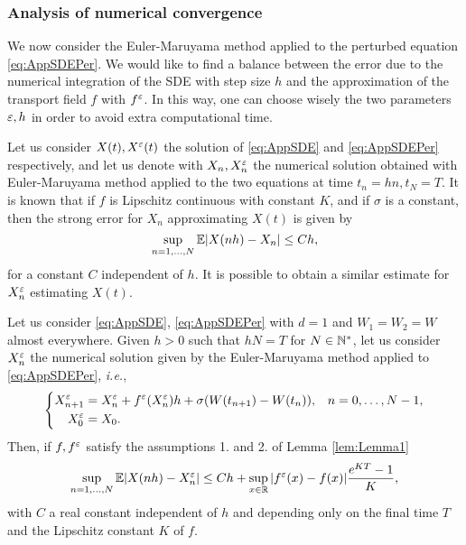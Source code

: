 \subsubsection{Analysis of numerical convergence}

We now consider the Euler-Maruyama method applied to the perturbed equation \eqref{eq:AppSDEPer}. We would like to find a balance between the error due to the numerical integration of the SDE with step size $h$ and the approximation of the transport field $f$ with $f^\varepsilon$. In this way, one can choose wisely the two parameters $\varepsilon, h$ in order to avoid extra computational time.

\noindent Let us consider $X(t), X^\varepsilon(t)$ the solution of \eqref{eq:AppSDE} and \eqref{eq:AppSDEPer} respectively, and let us denote with $X_n, X_n^\varepsilon$ the numerical solution obtained with Euler-Maruyama method applied to the two equations at time $t_n = hn, t_N = T$. It is known that if $f$ is Lipschitz continuous with constant $K$, and if $\sigma$ is a constant, then the strong error for $X_n$ approximating $X(t)$ is given by
\begin{equation}\label{eq:StrongEM}
	\sup_{n = 1, \dots, N} \mathbb{E} |X(nh) - X_n| \leq C h,
\end{equation}
for a constant $C$ independent of $h$. It is possible to obtain a similar estimate for $X_n^\varepsilon$ estimating $X(t)$. 
\begin{theorem}\label{thm:StrongConv} Let us consider \eqref{eq:AppSDE}, \eqref{eq:AppSDEPer} with $d = 1$ and $W_1 = W_2 = W$ almost everywhere. Given $h > 0$ such that $hN = T$ for $N \in \mathbb{N}^*$, let us consider $X_n^\varepsilon$ the numerical solution given by the Euler-Maruyama method applied to \eqref{eq:AppSDEPer}, \textit{i.e.},
\begin{equation*}
\left \{
\begin{aligned}
	X^\varepsilon_{n+1} &= X^\varepsilon_n + f^\varepsilon(X^\varepsilon_n)h + \sigma (W(t_{n+1}) - W(t_n)), && n = 0, \dots, N - 1, \\
	X^\varepsilon_0 &= X_0.
\end{aligned} \right .
\end{equation*}
Then, if $f, f^\varepsilon$ satisfy the assumptions 1. and 2. of Lemma \ref{lem:Lemma1}
\begin{equation}\label{eq:StrongConvEpl}
	\sup_{n = 1, \dots, N} \mathbb{E} |X(nh) - X^\varepsilon_n| \leq C h + \sup_{x \in \mathbb{R}} |f^\varepsilon(x) - f(x)| \frac{e^{KT} - 1}{K}, 
\end{equation}
with $C$ a real constant independent of $h$ and depending only on the final time $T$ and the Lipschitz constant $K$ of $f$.
\end{theorem}

